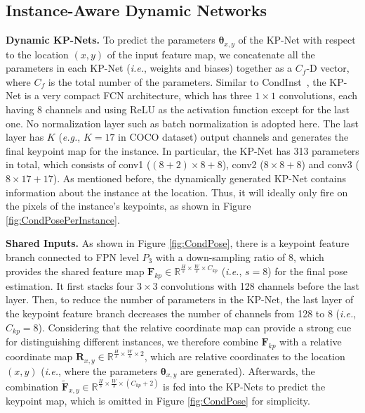 \documentclass[sigconf]{acmart}
\begin{document}
\subsection{Instance-Aware Dynamic Networks}

\textbf{Dynamic KP-Nets.}\quad
To predict the parameters $\bm{\theta}_{x,y}$ of the KP-Net with respect to the location $(x,y)$ of the input feature map, we concatenate all the parameters in each KP-Net (\emph{i.e.}, weights and biases) together as a $C_{f}$-D vector, where $C_{f}$ is the total number of the parameters.
Similar to CondInst~\cite{tian2020conditional}, the KP-Net is a very compact FCN architecture, which has three $1 \times 1$ convolutions, each having 8 channels and using ReLU as the activation function except for the last one.
No normalization layer such as batch normalization \cite{ioffe2015batch} is adopted here. 
The last layer has $K$ (\textit{e.g.}, $K=17$ in COCO \cite{lin2014microsoft} dataset) output channels and generates the final keypoint map for the instance.
In particular, the KP-Net has 313 parameters in total, which consists of conv1  ($(8+2) \times 8 + 8$), conv2 ($8 \times 8 + 8$) and conv3 ($8 \times 17 + 17$).
As mentioned before, the dynamically generated KP-Net contains information about the instance at the location. Thus, it will ideally only fire on the pixels of the instance's keypoints, as shown in Figure \ref{fig:CondPosePerInstance}.

\textbf{Shared Inputs.}\quad
As shown in Figure \ref{fig:CondPose}, there is a keypoint feature branch connected to FPN level $P_{3}$ with a down-sampling ratio of 8, which provides the shared feature map $\textbf{F}_{kp} \in \mathbb{R}^{\frac{H}{s} \times \frac{W}{s} \times C_{kp}} $ (\emph{i.e.}, $s=8$) for the final pose estimation.
It first stacks four $3 \times 3$ convolutions with 128 channels before the last layer.
Then, to reduce the number of parameters in the KP-Net, the last layer of the keypoint feature branch decreases the number of channels from 128 to 8 (\textit{i.e.}, $C_{kp}=8$).
Considering that the relative coordinate map can provide a strong cue for distinguishing different instances, we therefore combine $\textbf{F}_{kp}$ with a relative coordinate map
\begin{math}
  \mathbf{R}_{x,y} \in \mathbb{R}^{\frac{H}{s} \times \frac{W}{s} \times 2}
\end{math},
which are relative coordinates to the location $(x,y)$ (\textit{i.e.}, where the parameters $\bm{\theta}_{x,y}$ are generated).
Afterwards, the combination
\begin{math}
  \mathbf{\tilde{F}}_{x,y} \in \mathbb{R}^{\frac{H}{s} \times \frac{W}{s} \times (C_{kp}+2)}
\end{math}
is fed into the KP-Nets to predict the keypoint map, which is omitted in Figure \ref{fig:CondPose} for simplicity.
\end{document}
